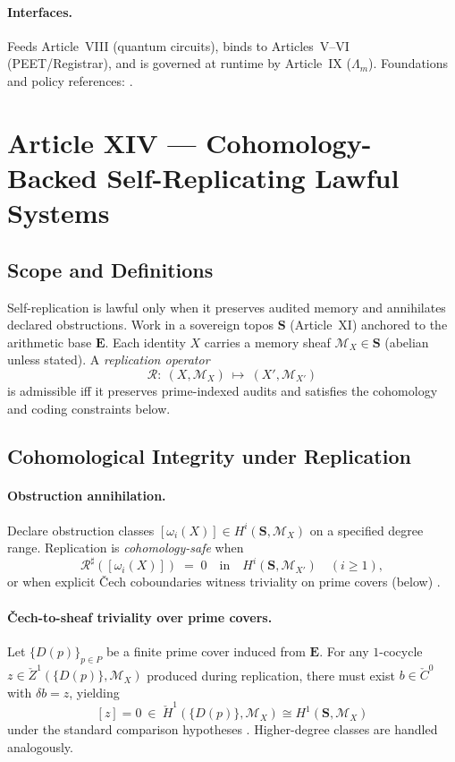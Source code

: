 \documentclass[12pt]{amsart}
\theoremstyle{plain}
\begin{document}
\paragraph{Interfaces.}
Feeds Article~VIII (quantum circuits), binds to Articles~V–VI (PEET/Registrar), and is governed at runtime by Article~IX ($\Lambda_m$). Foundations and policy references: \cite{etingof2015tensor,nayak2008nonabelian,kitaev2003fault,freedman2003topological,pachos2012introduction}.

\section{Article XIV — Cohomology-Backed Self-Replicating Lawful Systems}

\subsection{Scope and Definitions}
Self-replication is lawful only when it preserves audited memory and annihilates declared obstructions. Work in a sovereign topos $\mathbf{S}$ (Article~XI) anchored to the arithmetic base $\mathbf{E}$. Each identity $X$ carries a memory sheaf $\mathscr{M}_X\in\mathbf{S}$ (abelian unless stated). A \emph{replication operator}
\[
\mathcal{R}:\ (X,\mathscr{M}_X)\ \longmapsto\ (X',\mathscr{M}_{X'})
\]
is admissible iff it preserves prime-indexed audits and satisfies the cohomology and coding constraints below.

\subsection{Cohomological Integrity under Replication}
\paragraph{Obstruction annihilation.}
Declare obstruction classes $[\omega_i(X)]\in H^i(\mathbf{S},\mathscr{M}_X)$ on a specified degree range. Replication is \emph{cohomology-safe} when
\[
\mathcal{R}^\sharp([\omega_i(X)])\;=\;0\quad\text{in}\quad H^i(\mathbf{S},\mathscr{M}_{X'})\quad (i\ge1),
\]
or when explicit Čech coboundaries witness triviality on prime covers (below) \cite{maclane1992sheaves,johnstone2002elephant,hartshorne1977algebraic}.

\paragraph{Čech-to-sheaf triviality over prime covers.}
Let $\{D(p)\}_{p\in P}$ be a finite prime cover induced from $\mathbf{E}$. For any $1$-cocycle $z\in \check{Z}^1(\{D(p)\},\mathscr{M}_X)$ produced during replication, there must exist $b\in \check{C}^0$ with $\delta b=z$, yielding
\[
[z]=0\ \in\ \check{H}^1(\{D(p)\},\mathscr{M}_X)\cong H^1(\mathbf{S},\mathscr{M}_X)
\]
under the standard comparison hypotheses \cite{hartshorne1977algebraic,maclane1992sheaves,johnstone2002elephant}. Higher-degree classes are handled analogously.
\end{document}
